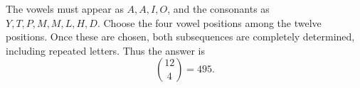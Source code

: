 The vowels must appear as $A,A,I,O$, and the consonants as $Y,T,P,M,M,L,H,D$. Choose the four vowel positions among the twelve positions. Once these are chosen, both subsequences are completely determined, including repeated letters. Thus the answer is
\[
\boxed{\binom{12}{4}=495}.
\]
